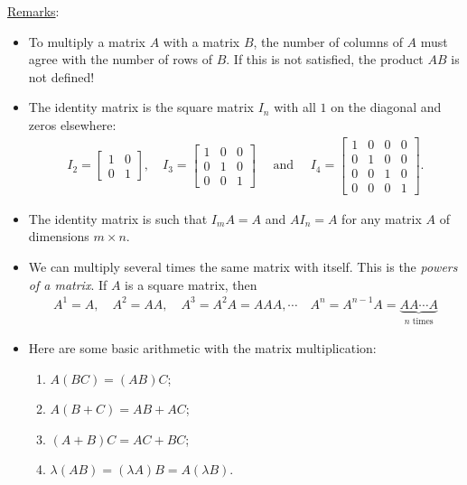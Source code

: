 \documentclass[12pt,a4paper]{article}
\begin{document}
	\noindent\underline{Remarks}:
	\begin{itemize}
	\item To multiply a matrix $A$ with a matrix $B$, the number of columns of $A$ must agree with the number of rows of $B$. If this is not satisfied, the product $AB$ is not defined!
	\item The identity matrix is the square matrix $I_n$ with all $1$ on the diagonal and zeros elsewhere:
		\begin{align*}
		I_2 = \begin{bmatrix}
		1 & 0 \\ 0 & 1
		\end{bmatrix} , \quad
		I_3 = \begin{bmatrix}
		1 & 0 & 0 \\
		0 & 1 & 0 \\
		0 & 0 & 1
		\end{bmatrix} \quad \text{ and } \quad
		I_4 = \begin{bmatrix}
		1 & 0 & 0 & 0 \\
		0 & 1 & 0 & 0 \\
		0 & 0 & 1 & 0 \\
		0 & 0 & 0 & 1
		\end{bmatrix} .
		\end{align*}
	\item The identity matrix is such that $I_m A = A$ and $A I_n = A$ for any matrix $A$ of dimensions $m \times n$.
	\item We can multiply several times the same matrix with itself. This is the \textit{powers of a matrix}. If $A$ is a square matrix, then
		\begin{align*}
		A^1 = A , \quad A^2 = AA , \quad A^3 = A^2 A = AAA , \cdots \quad A^n = A^{n-1} A = \underbrace{AA \cdots A}_{n \text{ times}}
		\end{align*}
	\item Here are some basic arithmetic with the matrix multiplication:
		\begin{enumerate}
		\item $A (BC) = (AB)C$;
		\item $A (B + C) = AB + AC$;
		\item $(A + B)C = AC + BC$;
		\item $\lambda (AB) = (\lambda A) B = A (\lambda B)$.
		\end{enumerate}
	\end{itemize}
	
\newpage
	
\end{document}
